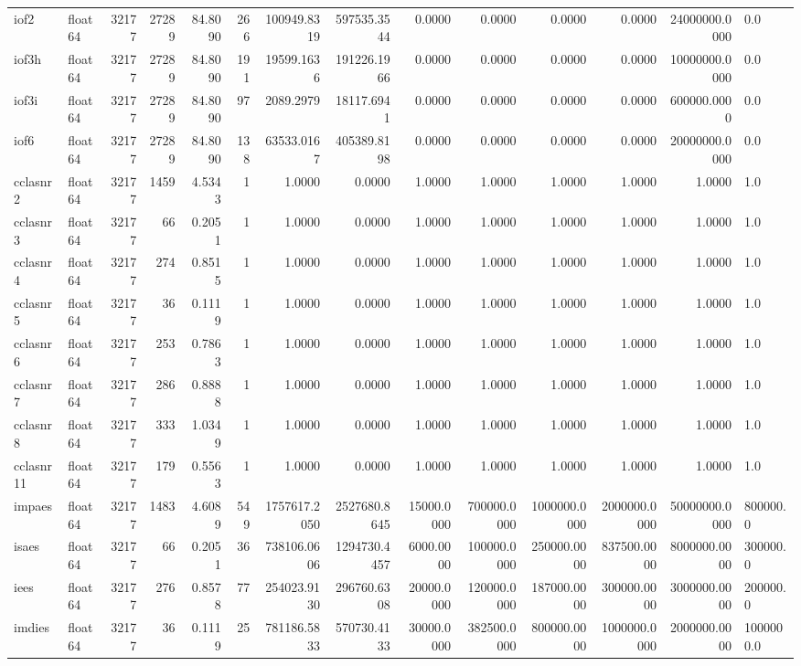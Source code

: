 \begin{longtable}{llrrrrrrrrrrrl}
iof2 & float64 & 32177 & 27289 & 84.8090 & 266 & 100949.8319 & 597535.3544 & 0.0000 & 0.0000 & 0.0000 & 0.0000 & 24000000.0000 & 0.0 \\
iof3h & float64 & 32177 & 27289 & 84.8090 & 191 & 19599.1636 & 191226.1966 & 0.0000 & 0.0000 & 0.0000 & 0.0000 & 10000000.0000 & 0.0 \\
iof3i & float64 & 32177 & 27289 & 84.8090 & 97 & 2089.2979 & 18117.6941 & 0.0000 & 0.0000 & 0.0000 & 0.0000 & 600000.0000 & 0.0 \\
iof6 & float64 & 32177 & 27289 & 84.8090 & 138 & 63533.0167 & 405389.8198 & 0.0000 & 0.0000 & 0.0000 & 0.0000 & 20000000.0000 & 0.0 \\
cclasnr2 & float64 & 32177 & 1459 & 4.5343 & 1 & 1.0000 & 0.0000 & 1.0000 & 1.0000 & 1.0000 & 1.0000 & 1.0000 & 1.0 \\
cclasnr3 & float64 & 32177 & 66 & 0.2051 & 1 & 1.0000 & 0.0000 & 1.0000 & 1.0000 & 1.0000 & 1.0000 & 1.0000 & 1.0 \\
cclasnr4 & float64 & 32177 & 274 & 0.8515 & 1 & 1.0000 & 0.0000 & 1.0000 & 1.0000 & 1.0000 & 1.0000 & 1.0000 & 1.0 \\
cclasnr5 & float64 & 32177 & 36 & 0.1119 & 1 & 1.0000 & 0.0000 & 1.0000 & 1.0000 & 1.0000 & 1.0000 & 1.0000 & 1.0 \\
cclasnr6 & float64 & 32177 & 253 & 0.7863 & 1 & 1.0000 & 0.0000 & 1.0000 & 1.0000 & 1.0000 & 1.0000 & 1.0000 & 1.0 \\
cclasnr7 & float64 & 32177 & 286 & 0.8888 & 1 & 1.0000 & 0.0000 & 1.0000 & 1.0000 & 1.0000 & 1.0000 & 1.0000 & 1.0 \\
cclasnr8 & float64 & 32177 & 333 & 1.0349 & 1 & 1.0000 & 0.0000 & 1.0000 & 1.0000 & 1.0000 & 1.0000 & 1.0000 & 1.0 \\
cclasnr11 & float64 & 32177 & 179 & 0.5563 & 1 & 1.0000 & 0.0000 & 1.0000 & 1.0000 & 1.0000 & 1.0000 & 1.0000 & 1.0 \\
impaes & float64 & 32177 & 1483 & 4.6089 & 549 & 1757617.2050 & 2527680.8645 & 15000.0000 & 700000.0000 & 1000000.0000 & 2000000.0000 & 50000000.0000 & 800000.0 \\
isaes & float64 & 32177 & 66 & 0.2051 & 36 & 738106.0606 & 1294730.4457 & 6000.0000 & 100000.0000 & 250000.0000 & 837500.0000 & 8000000.0000 & 300000.0 \\
iees & float64 & 32177 & 276 & 0.8578 & 77 & 254023.9130 & 296760.6308 & 20000.0000 & 120000.0000 & 187000.0000 & 300000.0000 & 3000000.0000 & 200000.0 \\
imdies & float64 & 32177 & 36 & 0.1119 & 25 & 781186.5833 & 570730.4133 & 30000.0000 & 382500.0000 & 800000.0000 & 1000000.0000 & 2000000.0000 & 1000000.0 \\

\end{longtable}
